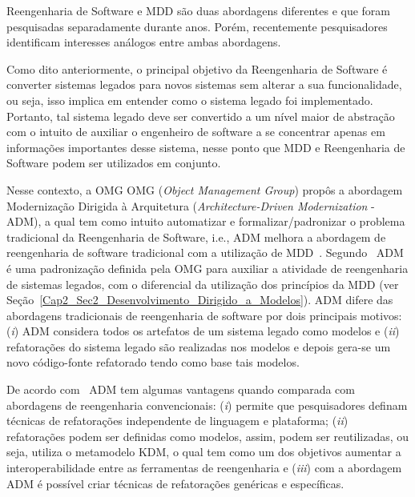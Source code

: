 

Reengenharia de Software e MDD são duas abordagens diferentes e que foram pesquisadas separadamente durante anos. Porém, recentemente pesquisadores identificam interesses análogos entre ambas abordagens. 

Como dito anteriormente, o principal objetivo da Reengenharia de Software é converter sistemas legados para novos sistemas sem alterar a sua funcionalidade, ou seja, isso implica em entender como o sistema legado foi implementado. Portanto, tal sistema legado deve ser convertido a um nível maior de abstração com o intuito de auxiliar o engenheiro de software a se concentrar apenas em informações importantes desse sistema, nesse ponto que MDD e Reengenharia de Software podem ser utilizados em conjunto.

Nesse contexto, a OMG OMG (\textit{Object Management Group}) propôs a abordagem Modernização Dirigida à Arquitetura (\textit{Architecture-Driven Modernization} - ADM), a qual tem como intuito automatizar e formalizar/padronizar o problema tradicional da Reengenharia de Software, i.e., ADM melhora a abordagem  de reengenharia de software tradicional com a utilização de MDD~\cite{PerezCastillo:2011jo}. Segundo~\citet{rezCastillo:2011gm} ADM é uma padronização definida pela OMG para auxiliar a atividade de reengenharia de sistemas legados, com o diferencial da utilização dos princípios da MDD (ver Seção~\ref{Cap2_Sec2_Desenvolvimento_Dirigido_a_Modelos}). ADM difere das abordagens tradicionais de reengenharia de software por dois principais motivos: (\textit{i}) ADM considera todos os artefatos de um sistema legado como modelos e (\textit{ii}) refatorações do sistema legado são realizadas nos modelos e depois gera-se um novo código-fonte refatorado tendo como base tais modelos. 

De acordo com~\citet{PerezCastillo:2011jo} ADM tem algumas vantagens quando comparada com abordagens de reengenharia convencionais: (\textit{i}) permite que pesquisadores definam técnicas de refatorações independente de linguagem e plataforma; (\textit{ii}) refatorações podem ser definidas como modelos, assim, podem ser reutilizadas, ou seja, utiliza o metamodelo KDM, o qual tem como um dos objetivos aumentar a interoperabilidade entre as ferramentas de reengenharia e (\textit{iii}) com a abordagem ADM é possível criar técnicas de refatorações genéricas e específicas. 


